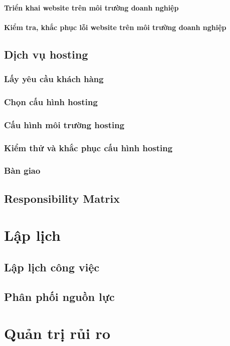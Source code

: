 \documentclass[a4paper]{book}
\begin{document}
\subsubsection{Triển khai website trên môi trường doanh nghiệp}
\subsubsection{Kiểm tra, khắc phục lỗi website trên môi trường doanh nghiệp}
\section{Dịch vụ hosting}
\subsection{Lấy yêu cầu khách hàng}
\subsection{Chọn cấu hình hosting}
\subsection{Cấu hình môi trường hosting}
\subsection{Kiểm thử và khắc phục cấu hình hosting}
\subsection{Bàn giao}
\section{Responsibility Matrix}
\chapter{Lập lịch}
\section{Lập lịch công việc}
\section{Phân phối nguồn lực}
\chapter{Quản trị rủi ro}
\newpage
\listoftables
\listoffigures
\newpage
 

\end{document}
